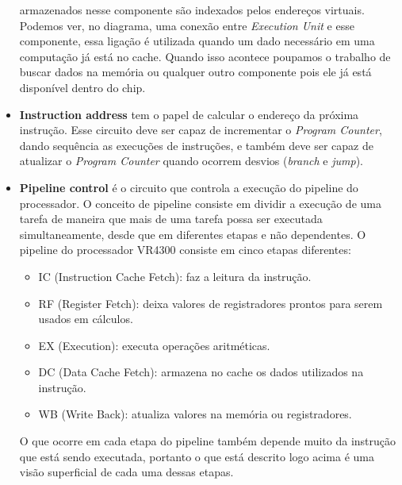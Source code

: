\documentclass[12pt]{article}
\begin{document}
\begin{itemize}
armazenados nesse componente são indexados pelos endereços virtuais.
Podemos ver, no diagrama, uma conexão entre {\em Execution Unit} e esse 
componente, essa ligação é utilizada quando um dado necessário em uma
computação já está no cache. Quando isso acontece poupamos o trabalho
de buscar dados na memória ou qualquer outro componente pois ele já
está disponível dentro do chip.
    \item {\bf Instruction address} tem o papel de calcular o endereço
da próxima instrução. Esse circuito deve ser capaz de incrementar o
{\em Program Counter}, dando sequência as execuções de instruções, e
também deve ser capaz de atualizar o {\em Program Counter} quando
ocorrem desvios ({\em branch} e {\em jump}).
    \item {\bf Pipeline control} é o circuito que controla a execução
do pipeline do processador. O conceito de pipeline consiste em dividir
a execução de uma tarefa de maneira que mais de uma tarefa possa ser
executada simultaneamente, desde que em diferentes etapas e não 
dependentes. O pipeline do processador VR4300 consiste em cinco etapas
diferentes:
    \begin{itemize}
        \item{IC (Instruction Cache Fetch):} faz a leitura da instrução.
        \item{RF (Register Fetch):} deixa valores de registradores 
prontos para serem usados em cálculos.
        \item{EX (Execution):} executa operações aritméticas.
        \item{DC (Data Cache Fetch):} armazena no cache os dados 
utilizados na instrução.
        \item{WB (Write Back):} atualiza valores na memória ou 
registradores.
    \end{itemize}
O que ocorre em cada etapa do pipeline também depende muito da instrução
que está sendo executada, portanto o que está descrito logo acima é uma
visão superficial de cada uma dessas etapas.
\end{itemize}
\end{document}
